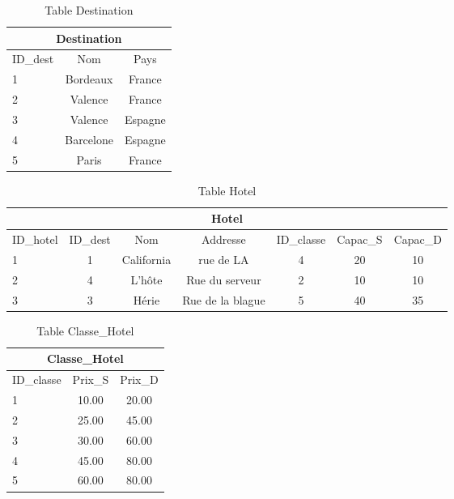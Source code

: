 \documentclass[10pt]{article}
\begin{document}
\begin{table}[h]
\begin{center}
\begin{tabular}{|l|c|c|}
\hline
\multicolumn{3}{|c|}{Destination}\\
\hline
ID\_dest& Nom & Pays \\
\hline
1 & Bordeaux& France\\
\hline
2 & Valence& France\\
\hline
3 & Valence& Espagne\\
\hline
4 & Barcelone& Espagne\\
\hline
5 & Paris& France\\
\hline
\end{tabular}
\end{center}
\caption{Table Destination}
\end{table}


\begin{table}[h]
\begin{center}
\begin{tabular}{|l|c|c|c|c|c|c|}
\hline
\multicolumn{7}{|c|}{Hotel}\\
\hline
ID\_hotel& ID\_dest& Nom & Addresse &ID\_classe & Capac\_S & Capac\_D  \\
\hline
1 & 1& California&rue de LA& 4 & 20 & 10\\
\hline
2 & 4& L'hôte&Rue du serveur& 2 & 10 & 10\\
\hline
3 & 3& Hérie&Rue de la blague& 5 & 40 & 35\\
\hline
\end{tabular}
\end{center}
\caption{Table Hotel}
\end{table}
\newpage


\begin{table}[h]
\begin{center}
\begin{tabular}{|l|c|c|}
\hline
\multicolumn{3}{|c|}{Classe\_Hotel}\\
\hline
ID\_classe& Prix\_S & Prix\_D \\
\hline
1 & 10.00& 20.00\\
\hline
2 & 25.00& 45.00\\
\hline
3 & 30.00& 60.00\\
\hline
4 &  45.00& 80.00\\
\hline
5 & 60.00& 80.00\\
\hline
\end{tabular}
\end{center}
\caption{Table Classe\_Hotel}
\end{table}
\end{document}
